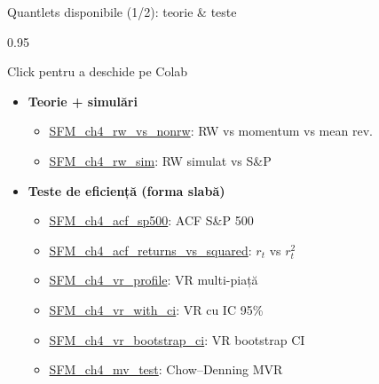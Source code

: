 \documentclass[9pt, aspectratio=169, t]{beamer}
\begin{document}
\begin{frame}[shrink=15]{Quantlets disponibile (1/2): teorie \& teste}
\begin{cminipage}{0.95\textwidth}
\begin{block}{Click pentru a deschide pe Colab}
\footnotesize
\begin{itemize}\setlength{\itemsep}{0pt}
    \item \textbf{Teorie + simulări}
    \begin{itemize}\setlength{\itemsep}{0pt}
        \item \href{https://colab.research.google.com/github/QuantLet/Stat_fin_markets/blob/master/Ch_04/SFM_ch4_rw_vs_nonrw/SFM_ch4_rw_vs_nonrw.ipynb}{SFM\_ch4\_rw\_vs\_nonrw}: RW vs momentum vs mean rev.
        \item \href{https://colab.research.google.com/github/QuantLet/Stat_fin_markets/blob/master/Ch_04/SFM_ch4_rw_sim/SFM_ch4_rw_sim.ipynb}{SFM\_ch4\_rw\_sim}: RW simulat vs S\&P
    \end{itemize}
    \item \textbf{Teste de eficiență (forma slabă)}
    \begin{itemize}\setlength{\itemsep}{0pt}
        \item \href{https://colab.research.google.com/github/QuantLet/Stat_fin_markets/blob/master/Ch_04/SFM_ch4_acf_sp500/SFM_ch4_acf_sp500.ipynb}{SFM\_ch4\_acf\_sp500}: ACF S\&P 500
        \item \href{https://colab.research.google.com/github/QuantLet/Stat_fin_markets/blob/master/Ch_04/SFM_ch4_acf_returns_vs_squared/SFM_ch4_acf_returns_vs_squared.ipynb}{SFM\_ch4\_acf\_returns\_vs\_squared}: $r_t$ vs $r_t^2$
        \item \href{https://colab.research.google.com/github/QuantLet/Stat_fin_markets/blob/master/Ch_04/SFM_ch4_vr_profile/SFM_ch4_vr_profile.ipynb}{SFM\_ch4\_vr\_profile}: VR multi-piață
        \item \href{https://colab.research.google.com/github/QuantLet/Stat_fin_markets/blob/master/Ch_04/SFM_ch4_vr_with_ci/SFM_ch4_vr_with_ci.ipynb}{SFM\_ch4\_vr\_with\_ci}: VR cu IC 95\%
        \item \href{https://colab.research.google.com/github/QuantLet/Stat_fin_markets/blob/master/Ch_04/SFM_ch4_vr_bootstrap_ci/SFM_ch4_vr_bootstrap_ci.ipynb}{SFM\_ch4\_vr\_bootstrap\_ci}: VR bootstrap CI
        \item \href{https://colab.research.google.com/github/QuantLet/Stat_fin_markets/blob/master/Ch_04/SFM_ch4_mv_test/SFM_ch4_mv_test.ipynb}{SFM\_ch4\_mv\_test}: Chow--Denning MVR

\end{itemize}
\end{itemize}
\end{block}
\end{cminipage}
\end{frame}
\end{document}
